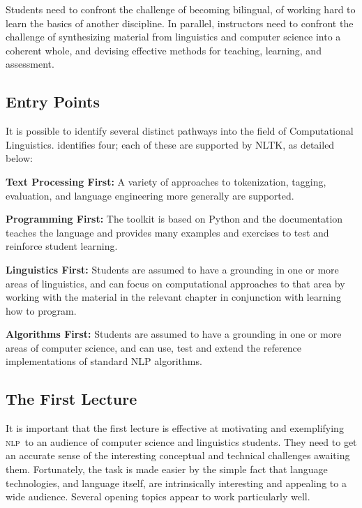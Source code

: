 \documentclass[11pt]{article}
\newcommand{\NLP}{\textsc{nlp}}
\begin{document}
Students need to confront the challenge of becoming bilingual, of
working hard to learn the basics of another discipline.  In parallel,
instructors need to confront the challenge of synthesizing material
from linguistics and computer science into a coherent whole, and
devising effective methods for teaching, learning, and assessment.

\subsection{Entry Points}

It is possible to identify several distinct pathways into the field of
Computational Linguistics.   identifies four;
each of these are supported by NLTK, as detailed below:

\textbf{Text Processing First:} A variety of approaches to tokenization,
tagging, evaluation, and language engineering more generally are
supported.

\textbf{Programming First:} The toolkit is based on Python and
the documentation teaches the language and provides many examples and
exercises to test and reinforce student learning.

\textbf{Linguistics First:} Students are assumed to have a grounding in
one or more areas of linguistics, and can focus on computational
approaches to that area by working with the material in the relevant
chapter in conjunction with learning how to program.

\textbf{Algorithms First:} Students are assumed to have a grounding in
one or more areas of computer science, and can use, test and extend
the reference implementations of standard NLP algorithms.

\subsection{The First Lecture}

It is important that the first lecture is effective at motivating and
exemplifying \NLP\ to an audience of computer science and linguistics
students.  They need to get an accurate sense of the interesting
conceptual and technical challenges awaiting them.  Fortunately, the
task is made easier by the simple fact that language technologies, and
language itself, are intrinsically interesting and appealing to a wide audience.
Several opening topics appear to work particularly well.
\end{document}
